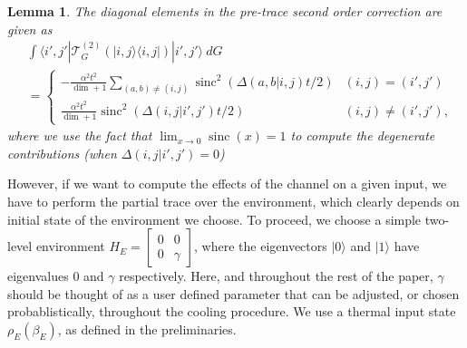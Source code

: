 \documentclass{article}
\newtheorem{lemma}[theorem]{Lemma}
\newcommand{\ket}[1]{|#1\rangle}
\newcommand{\bra}[1]{\langle #1|}
\newcommand{\ketbra}[2]{| #1\rangle\! \langle #2|}
\DeclareMathOperator{\sinc}{sinc}
\begin{document}
\begin{lemma} \label{lem:t_2_both}
    The diagonal elements in the pre-trace second order correction are given as
    \begin{align}
        &\int \bra{i', j'} \mathcal{T}^{(2)}_G \left( \ketbra{i, j}{i, j} \right) \ket{i', j'} ~dG \\
        &= \begin{cases}
            - \frac{\alpha^2 t^2 }{\dim + 1} \sum_{(a,b) \neq (i, j)} \sinc^2(\Delta(a,b|i,j) t / 2) & (i,j) = (i', j') \\
    \frac{\alpha^2 t^2 }{\dim + 1} \sinc^2(\Delta(i,j | i', j') t /2) & (i, j) \neq (i', j'),
        \end{cases} \label{eq:second_order_transitions_final_final}
    \end{align}
    where we use the fact that $\lim_{x \to 0} \sinc(x) = 1$ to compute the degenerate contributions (when $\Delta(i, j | i', j') = 0$)
\end{lemma}
However, if we want to compute the effects of the channel on a given input, we have to perform the partial trace over the environment, which clearly depends on initial state of the environment we choose. To proceed, we choose a simple two-level environment $H_E = \begin{bmatrix}
    0 & 0 \\ 0 & \gamma
\end{bmatrix}$, where the eigenvectors $\ket{0}$ and $\ket{1}$ have eigenvalues 0 and $\gamma$ respectively. Here, and throughout the rest of the paper, $\gamma$ should be thought of as a user defined parameter that can be adjusted, or chosen probablistically, throughout the cooling procedure. We use a thermal input state $\rho_E(\beta_E)$, as defined in the preliminaries. 
\end{document}
